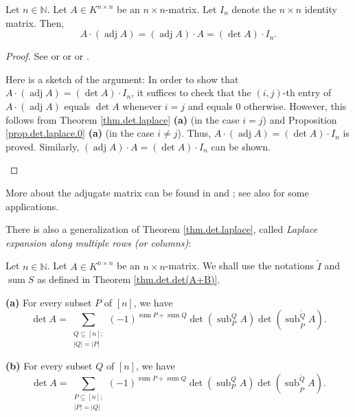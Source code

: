 \begin{theorem}
\label{thm.det.adj.inverse}Let $n\in\mathbb{N}$. Let $A\in K^{n\times n}$ be
an $n\times n$-matrix. Let $I_{n}$ denote the $n\times n$ identity matrix.
Then,%
\[
A\cdot\left(  \operatorname*{adj}A\right)  =\left(  \operatorname*{adj}%
A\right)  \cdot A=\left(  \det A\right)  \cdot I_{n}.
\]

\end{theorem}

\begin{proof}
See \cite[Theorem 6.100]{detnotes} or \cite[Lemma 4.7.9]{Ford21} or
\cite[Theorem 9.50]{Loehr-BC} or \cite[Proposition B.28]{Strick13}. \medskip

\begin{fineprint}
Here is a sketch of the argument: In order to show that $A\cdot\left(
\operatorname*{adj}A\right)  =\left(  \det A\right)  \cdot I_{n}$, it suffices
to check that the $\left(  i,j\right)  $-th entry of $A\cdot\left(
\operatorname*{adj}A\right)  $ equals $\det A$ whenever $i=j$ and equals $0$
otherwise. However, this follows from Theorem \ref{thm.det.laplace}
\textbf{(a)} (in the case $i=j$) and Proposition \ref{prop.det.laplace.0}
\textbf{(a)} (in the case $i\neq j$). Thus, $A\cdot\left(  \operatorname*{adj}%
A\right)  =\left(  \det A\right)  \cdot I_{n}$ is proved. Similarly, $\left(
\operatorname*{adj}A\right)  \cdot A=\left(  \det A\right)  \cdot I_{n}$ can
be shown.
\end{fineprint}
\end{proof}

More about the adjugate matrix can be found in \cite[\S 6.15]{detnotes} and
\cite[\S 5.4--\S 5.6]{trach}; see also \cite{Robins05} for some applications.

There is also a generalization of Theorem \ref{thm.det.laplace}, called
\emph{Laplace expansion along multiple rows (or columns)}:

\begin{theorem}
\label{thm.det.laplace-multi}Let $n\in\mathbb{N}$. Let $A\in K^{n\times n}$ be
an $n\times n$-matrix. We shall use the notations $\widetilde{I}$ and
$\operatorname*{sum}S$ as defined in Theorem \ref{thm.det.det(A+B)}. \medskip

\textbf{(a)} For every subset $P$ of $\left[  n\right]  $, we have%
\[
\det A=\sum_{\substack{Q\subseteq\left[  n\right]  ;\\\left\vert Q\right\vert
=\left\vert P\right\vert }}\left(  -1\right)  ^{\operatorname*{sum}%
P+\operatorname*{sum}Q}\det\left(  \operatorname*{sub}\nolimits_{P}%
^{Q}A\right)  \det\left(  \operatorname*{sub}\nolimits_{\widetilde{P}%
}^{\widetilde{Q}}A\right)  .
\]


\textbf{(b)} For every subset $Q$ of $\left[  n\right]  $, we have%
\[
\det A=\sum_{\substack{P\subseteq\left[  n\right]  ;\\\left\vert P\right\vert
=\left\vert Q\right\vert }}\left(  -1\right)  ^{\operatorname*{sum}%
P+\operatorname*{sum}Q}\det\left(  \operatorname*{sub}\nolimits_{P}%
^{Q}A\right)  \det\left(  \operatorname*{sub}\nolimits_{\widetilde{P}%
}^{\widetilde{Q}}A\right)  .
\]

\end{theorem}

